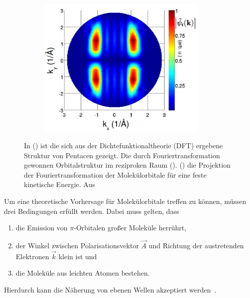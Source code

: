 \begin{figure}
\begin{subfigure}{0.3\textwidth}
                \caption{}
                \label{fig:DFT2}
            \end{subfigure}
            \begin{subfigure}{0.3\textwidth}
                \centering
                \includegraphics[width=0.9\textwidth]{DFT3.PNG}
                \caption{}
                \label{fig:DFT3}
            \end{subfigure}
            \caption{In () ist die sich aus der Dichtefunktionaltheorie (DFT) ergebene Struktur von Pentacen gezeigt.
            Die durch Fouriertransformation gewonnen Orbitalstruktur im reziproken Raum ().
            () die Projektion der Fouriertransformation der Molekülorbitale für eine feste kinetische Energie.
            Aus~\cite{MM_2}}
            \label{fig:DFT}
        \end{figure}
        Um eine theoretische Vorhersage für Molekülorbitale treffen zu können, müssen drei Bedingungen erfüllt werden.
        Dabei muss gelten, dass
        \begin{enumerate}
            \item die Emission von $\pi$-Orbitalen großer Moleküle herrührt,
            \item der Winkel zwischen Polarisationsvektor $\vec{A}$ und Richtung der austretenden Elektronen $\vec{k}$ klein ist und
            \item die Moleküle aus leichten Atomen bestehen.
        \end{enumerate}
        Hierdurch kann die Näherung von ebenen Wellen akzeptiert werden~\cite{MM_2}.
